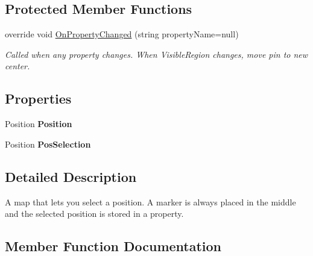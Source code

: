 \subsection*{Protected Member Functions}
\begin{DoxyCompactItemize}
\item 
override void \mbox{\hyperlink{class_tutor_scout24_1_1_controls_1_1_selection_map_a3fc108daa85f2ef29d77d7a3d33e2995}{On\+Property\+Changed}} (string property\+Name=null)
\begin{DoxyCompactList}\small\item\em Called when any property changes. When Visible\+Region changes, move pin to new center. \end{DoxyCompactList}\end{DoxyCompactItemize}
\subsection*{Properties}
\begin{DoxyCompactItemize}
\item 
\mbox{\label{class_tutor_scout24_1_1_controls_1_1_selection_map_ae2bc6c019abb04c5f65b188bb5e9a575}} 
Position {\bfseries Position}
\item 
\mbox{\label{class_tutor_scout24_1_1_controls_1_1_selection_map_a8650019747a053049fa19d650c6adcb9}} 
Position {\bfseries Pos\+Selection}
\end{DoxyCompactItemize}


\subsection{Detailed Description}
A map that lets you select a position. A marker is always placed in the middle and the selected position is stored in a property. 



\subsection{Member Function Documentation}
\mbox{\label{class_tutor_scout24_1_1_controls_1_1_selection_map_ab2558decc7d57c270b0fe0f5977be530}} 
